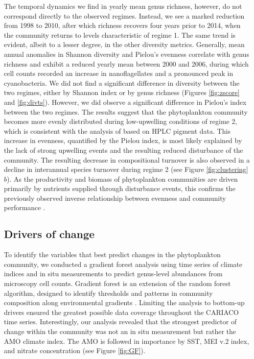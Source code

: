 \documentclass[draft]{agujournal2019}
\begin{document}
The temporal dynamics we find in yearly mean genus richness, however, do not correspond directly to the observed regimes. Instead, we see a marked reduction from 1998 to 2010, after which richness recovers four years prior to 2014, when the community returns to levels characteristic of regime 1. The same trend is evident, albeit to a lesser degree, in the other diversity metrics. Generally, mean annual anomalies in Shannon diversity and Pielou's evenness correlate with genus richness and exhibit a reduced yearly mean between 2000 and 2006, during which cell counts recorded an increase in nanoflagellates and a pronounced peak in cyanobacteria.
We did not find a significant difference in diversity between the two regimes, either by Shannon index or by genus richness (Figures \ref{fig:zscore} and \ref{fig:divts}). However, we did observe a significant difference in Pielou's index between the two regimes. The results suggest that the phytoplankton community becomes more evenly distributed during low-upwelling conditions of regime 2, which is consistent with the analysis of \citeauthor{pinckney_phytoplankton_2015} based on HPLC pigment data. This increase in evenness, quantified by the Pielou index, is most likely explained by the lack of strong upwelling events and the resulting reduced disturbance of the community. The resulting decrease in compositional turnover is also observed in a decline in interannual species turnover during regime 2 (see Figure \ref{fig:clustering}$b$). As the productivity and biomass of phytoplankton communities are driven primarily by nutrients supplied through disturbance events, this confirms the previously observed inverse relationship between evenness and community performance \cite{lehtinen_phytoplankton_2017, otero_phytoplankton_2020}.



\subsection{Drivers of change}
To identify the variables that best predict changes in the phytoplankton community, we conducted a gradient forest analysis using time series of climate indices and in situ measurements to predict genus-level abundances from microscopy cell counts. Gradient forest is an extension of the random forest algorithm, designed to identify thresholds and patterns in community composition along environmental gradients \cite{ellis_gradient_2012}. Limiting the analysis to bottom-up drivers ensured the greatest possible data coverage throughout the CARIACO time series. Interestingly, our analysis revealed that the strongest predictor of change within the community was not an in situ measurement but rather the AMO climate index. The AMO is followed in importance by SST, MEI v.2 index, and nitrate concentration (see Figure \ref{fig:GF}).
\end{document}

